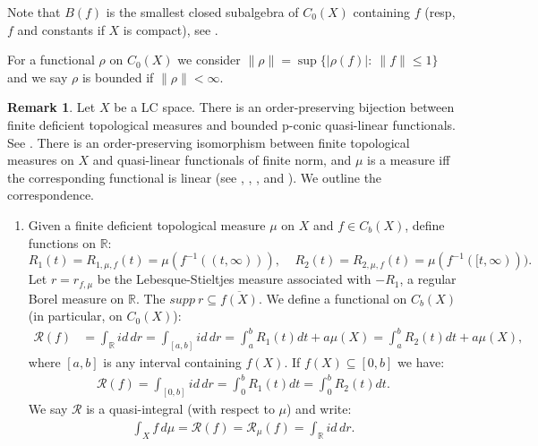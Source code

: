 \documentclass[sn-mathphys-num]{sn-jnl}%
\theoremstyle{thmstyleone}%
\theoremstyle{definition}
\newtheorem{remark}[theorem]{Remark}
\begin{document}
\noindent
Note that $B(f)$ is the smallest closed subalgebra of $C_0(X)$ containing $f$ (resp, $f$ and constants if $X$ is compact), see \cite[L. 1.4]{Butler:QLFLC}. 

\noindent
For a functional $\rho$ on $C_0(X)$ we consider $\| \rho \| =  \sup \{ | \rho(f) | : \  \| f \| \le 1 \} $ and we say $\rho$ is bounded if $\| \rho \| < \infty$.

\begin{remark} \label{RemBRT}
Let $X$ be a LC space. 
There is an order-preserving bijection between finite deficient topological measures and bounded p-conic quasi-linear functionals.  
See \cite[Sect. 5,7,8]{Butler:ReprDTM}.
There is an order-preserving isomorphism between finite 
topological measures on $X$ and quasi-linear functionals 
of finite norm, and $\mu$ is a measure iff the 
corresponding functional is linear (see \cite[Th. 8.7]{Butler:ReprDTM}, \cite[Th. 3.9]{Alf:ReprTh}, \cite[Th. 15]{Svistula:DTM}, 
and \cite[Th. 3.9]{Butler:QLFLC}).
We outline the correspondence.
\begin{enumerate} [leftmargin=0.2in, label=(\Roman*),ref=(\Roman*)] 
\item \label{prt1}
Given a finite deficient  topological measure $\mu$ on $X$ and $f \in C_b(X)$, define functions on $\mathbb{R}$:
$$ R_1 (t) = R_{1, \mu, f} (t) =  \mu(f^{-1} ((t, \infty) )), \ \ \ \ \   R_2 (t) =  R_{2,  \mu, f} (t) =\mu(f^{-1} ([t, \infty) )). $$
Let $r=r_{f, \mu}$ be the Lebesque-Stieltjes measure associated with $-R_1$, a regular Borel measure on $ \mathbb{R}$. 
The $ supp \ r \subseteq \overline{f(X)}$.
We define a functional on $C_b(X)$ (in particular, on  $C_0(X)$):
\begin{align*} 
\mathcal{R} (f) & = \int _{\mathbb{R}}  id \, dr = \int_{[a,b]} id \, dr  =   \int_a^b R_1 (t) dt + a \mu(X)  =  \int_a^b R_2 (t) dt + a \mu(X), 
\end{align*}
where $[a,b]$ is any interval containing $f(X)$.
If $f(X) \subseteq [0,b]$ we have:
\begin{align*} 
 \mathcal{R} (f) = \int_{[0,b]}  id \, dr  =   \int_0^b R_1 (t) dt =   \int_0^b R_2 (t) dt.
\end{align*}
We say $\mathcal{R}$  is a quasi-integral (with respect to $ \mu$) and write:
\begin{align*} 
\int_X f \, d\mu = \mathcal{R}(f) = \mathcal{R}_{\mu} (f) =  \int _{\mathbb{R}}  id \, dr.

\end{align*}
\end{enumerate}
\end{remark}
\end{document}
